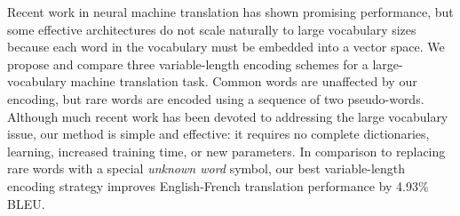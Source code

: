 Recent work in neural machine translation has shown promising performance, but some effective
architectures do not scale naturally to large vocabulary sizes because each
word in the vocabulary must be embedded into a vector space. We propose and compare
three variable-length encoding schemes for a large-vocabulary machine
translation task. Common words are unaffected by our encoding, but rare
words are encoded using a sequence of two pseudo-words. Although much recent work
has been devoted to addressing the large vocabulary issue, our method is simple and effective:
it requires no complete dictionaries, learning, increased training time, or new parameters. In comparison to
replacing rare words with a special \emph{unknown word} symbol, our best
variable-length encoding strategy improves English-French translation
performance by 4.93\% BLEU.
